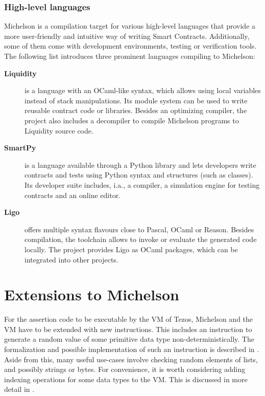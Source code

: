 \subsubsection{High-level languages}\label{sec:languages}
Michelson is a compilation target for various high-level languages that provide a more user-friendly and intuitive way of writing Smart Contracts. Additionally, some of them come with development environments, testing or verification tools. The following list introduces three prominent languages compiling to Michelson:
\begin{description}
\item[\textbf{Liquidity}] \cite{liquidity} is a language with an OCaml-like syntax, which allows using local variables instead of stack manipulations. Its module system can be used to write reusable contract code or libraries. Besides an optimizing compiler, the project also includes a decompiler to compile Michelson programs to Liquidity source code.
\item[\textbf{SmartPy}] \cite{smartpy} is a language available through a Python library and lets developers write contracts and tests using Python syntax and structures (such as classes). Its developer suite includes, i.a., a compiler, a simulation engine for testing contracts and an online editor.
\item [\textbf{Ligo}] \cite{ligo} offers multiple syntax flavours close to Pascal, OCaml or Reason. Besides compilation, the toolchain allows to invoke or evaluate the generated code locally. The project provides Ligo as OCaml packages, which can be integrated into other projects.
\end{description}

\section{Extensions to Michelson}\label{sec:ext_michelson}
For the assertion code to be executable by the VM of Tezos, Michelson and the VM have to be extended with new instructions. This includes an instruction to generate a random value of some primitive data type non-deterministically. The formalization and possible implementation of such an instruction is described in . Aside from this, many useful use-cases involve checking random elements of lists, and possibly strings or bytes. For convenience, it is worth considering adding indexing operations for some data types to the VM. This is discussed in more detail in .

